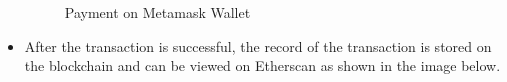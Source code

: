 \begin{itemize}
    \begin{figure} [H] \centering
    \caption{Payment on Metamask Wallet}
    \label{fig:metamask_payment}
    \end{figure}

    \item After the transaction is successful, the record of the transaction is stored on the blockchain and can be viewed on Etherscan as shown in the image below.


\end{itemize}
